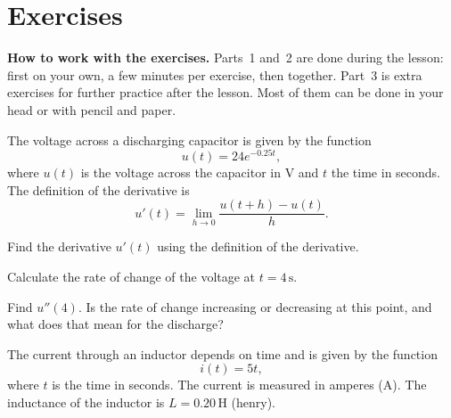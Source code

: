 
\section{Exercises}
\label{c14:sec:uppgifter}

\begin{aside}
\textbf{How to work with the exercises.} Parts~1 and~2 are done during the lesson: first on your
own, a few minutes per exercise, then together. Part~3 is extra exercises for further practice
after the lesson. Most of them can be done in your head or with pencil and paper.

\end{aside}


The voltage across a discharging capacitor is given by the function
\[
  u(t) = 24e^{-0.25t},
\]
where $u(t)$ is the voltage across the capacitor in V and $t$ the time in seconds. The definition
of the derivative is
\[
  u'(t) = \lim_{h \to 0} \frac{u(t + h) - u(t)}{h}.
\]
\begin{parts}
  \item Find the derivative $u'(t)$ using the definition of the derivative.
  \item Calculate the rate of change of the voltage at $t = 4\,\text{s}$.
  \item Find $u''(4)$. Is the rate of change increasing or decreasing at this point, and what does
    that mean for the discharge?
\end{parts}


The current through an inductor depends on time and is given by the function
\[
  i(t) = 5t,
\]
where $t$ is the time in seconds. The current is measured in amperes (A). The inductance of the
inductor is $L = 0.20\,\text{H}$ (henry).

